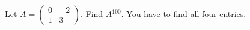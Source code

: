 Let $A = \begin{pmatrix}
            0 & -2 \\
            1 & 3
         \end{pmatrix}$. Find $A^{100}$. You have to find all four entries.
